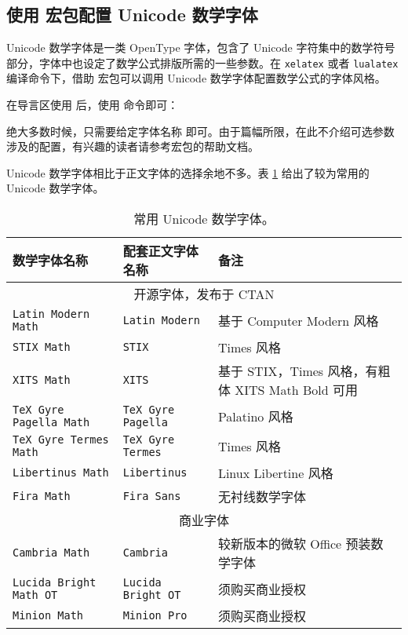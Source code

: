 \subsection{使用  宏包配置 Unicode 数学字体}\label{subsec:unicode-math}

Unicode 数学字体是一类 OpenType 字体，包含了 Unicode 字符集中的数学符号部分，字体中也设定了数学公式排版所需的一些参数。在 \texttt{xelatex} 或者 \texttt{lualatex} 编译命令下，借助  宏包可以调用 Unicode 数学字体配置数学公式的字体风格。

在导言区使用  后，使用  命令即可：
\begin{command}
\end{command}

绝大多数时候，只需要给定字体名称  即可。由于篇幅所限，在此不介绍可选参数  涉及的配置，有兴趣的读者请参考宏包的帮助文档。

Unicode 数学字体相比于正文字体的选择余地不多。表 \ref{tbl:uni-math-fonts} 给出了较为常用的 Unicode 数学字体。

\begin{table}[htp]
\centering\small
\caption{常用 Unicode 数学字体。}
\label{tbl:uni-math-fonts}
\begin{tabular}{llp{20em}}
\hline
\textbf{数学字体名称} & \textbf{配套正文字体名称} & \textbf{备注}\\
\hline
\multicolumn{3}{c}{开源字体，发布于 CTAN} \\
\hline
\texttt{Latin Modern Math}       & \texttt{Latin Modern}         & 基于 Computer Modern 风格 \\
\texttt{STIX Math}               & \texttt{STIX}                 & Times 风格 \\
\texttt{XITS Math}               & \texttt{XITS}                 & 基于 STIX，Times 风格，有粗体 XITS Math Bold 可用 \\
\texttt{TeX Gyre Pagella Math}   & \texttt{TeX Gyre Pagella}     & Palatino 风格 \\
\texttt{TeX Gyre Termes Math}    & \texttt{TeX Gyre Termes}      & Times 风格 \\
\texttt{Libertinus Math}         & \texttt{Libertinus}           & Linux Libertine 风格 \\
\texttt{Fira Math}               & \texttt{Fira Sans}            & 无衬线数学字体 \\
\hline
\multicolumn{3}{c}{商业字体} \\
\hline
\texttt{Cambria Math}            & \texttt{Cambria}              & 较新版本的微软 Office 预装数学字体 \\
\texttt{Lucida Bright Math OT}   & \texttt{Lucida Bright OT}     & 须购买商业授权 \\
\texttt{Minion Math}             & \texttt{Minion Pro}           & 须购买商业授权 \\
\hline
\end{tabular}
\end{table}

